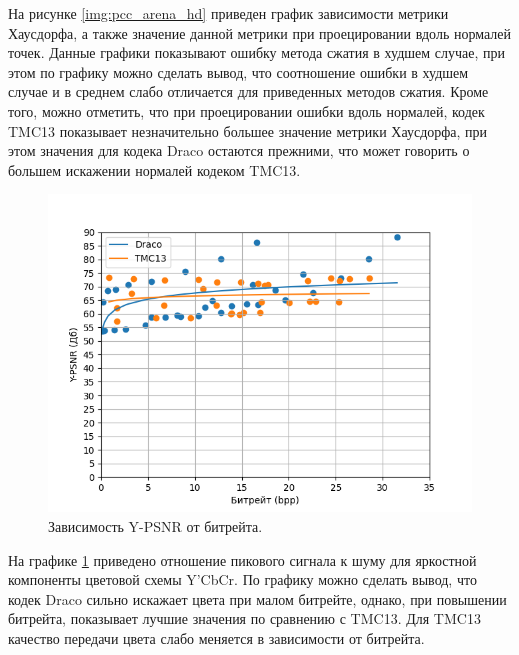 На рисунке \ref{img:pcc_arena_hd} приведен график зависимости метрики Хаусдорфа,
а также значение данной метрики при проецировании вдоль нормалей точек. Данные
графики показывают ошибку метода сжатия в худшем случае, при этом по графику
можно сделать вывод, что соотношение ошибки в худшем случае и в среднем слабо
отличается для приведенных методов сжатия. Кроме того, можно отметить, что при
проецировании ошибки вдоль нормалей, кодек TMC13 показывает незначительно
большее значение метрики Хаусдорфа, при этом значения для кодека Draco остаются
прежними, что может говорить о большем искажении нормалей кодеком TMC13.

\begin{figure}[H]
    \centering
    \includegraphics[width=\linewidth]{assets/pcc_arena/approx_y_psnr.png}
    \caption{ Зависимость Y-PSNR от битрейта. }
    \label{img:pcc_arena_y_psnr}
\end{figure}

На графике \ref{img:pcc_arena_y_psnr} приведено отношение пикового сигнала к
шуму для яркостной компоненты цветовой схемы Y'CbCr. По графику можно сделать
вывод, что кодек Draco сильно искажает цвета при малом битрейте, однако, при
повышении битрейта, показывает лучшие значения по сравнению с TMC13. Для TMC13
качество передачи цвета слабо меняется в зависимости от битрейта.






